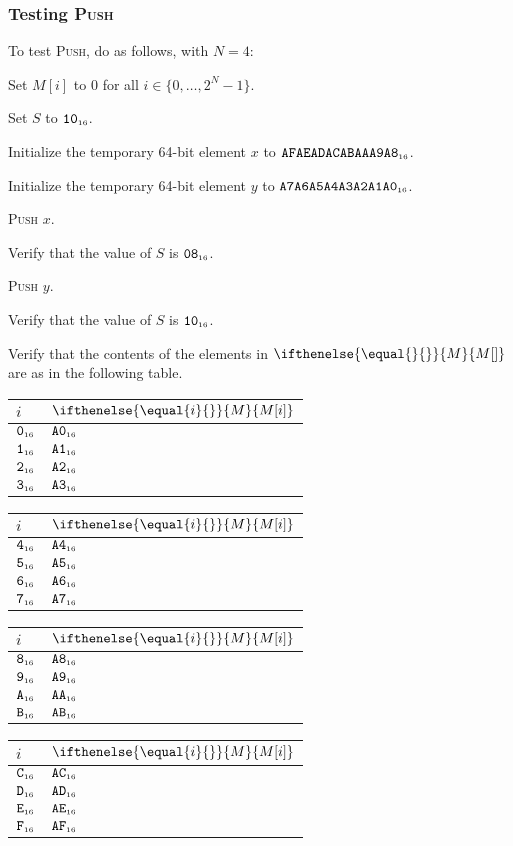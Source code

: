 \documentclass[a4paper,12pt]{article}
\makeatletter
\newcommand{\num}[1]{\texttt{#1}}
\newcommand{\hex}[1]{\num{#1}_{\textup{\tiny 16}}}
\newcommand{\MEM}[1]{\ifthenelse{\equal{#1}{}}{M}{M[#1]}}
\newcommand{\SP}{S}
\newcommand{\range}[2]{\{#1,\ldots,#2\}}
\newcommand{\proc}[1]{\textsc{#1}}
\newenvironment{memtable}{%
  \begin{trivlist}
    \item
    }{%
    \end{trivlist}}
\newenvironment{memcolumn}{%
  \begin{tabular}{@{}ll@{}}
    $i$ & $\MEM{i}$ \\
    \hline}
    {%
    \hline
  \end{tabular}}
\newcommand{\memspace}{\qquad}
\makeatother
\begin{document}
\subsubsection{Testing \proc{Push}}

To test \proc{Push}, do as follows, with $N=4$:
\begin{stepnumbers}
\item Set $M[i]$ to 0 for all $i \in \range{0}{2^N-1}$.
\item Set $\SP$ to $\hex{10}$.
\item Initialize the temporary 64-bit element $x$ to $\hex{AFAEADACABAAA9A8}$.
\item Initialize the temporary 64-bit element $y$ to $\hex{A7A6A5A4A3A2A1A0}$.
\item \proc{Push} $x$.
\item Verify that the value of $\SP$ is $\hex{08}$.
\item \proc{Push} $y$.
\item Verify that the value of $\SP$ is $\hex{10}$.
\item Verify that the contents of the elements in $\MEM{}$ are as in the following table.
\end{stepnumbers}

\begin{memtable}
  \begin{memcolumn}
    $\hex{0}$ & $\hex{A0}$ \\
    $\hex{1}$ & $\hex{A1}$ \\
    $\hex{2}$ & $\hex{A2}$ \\
    $\hex{3}$ & $\hex{A3}$ \\
  \end{memcolumn}
  \memspace
  \begin{memcolumn}
    $\hex{4}$ & $\hex{A4}$ \\
    $\hex{5}$ & $\hex{A5}$ \\
    $\hex{6}$ & $\hex{A6}$ \\
    $\hex{7}$ & $\hex{A7}$ \\
  \end{memcolumn}
  \memspace
  \begin{memcolumn}
    $\hex{8}$ & $\hex{A8}$ \\
    $\hex{9}$ & $\hex{A9}$ \\
    $\hex{A}$ & $\hex{AA}$ \\
    $\hex{B}$ & $\hex{AB}$ \\
  \end{memcolumn}
  \memspace
  \begin{memcolumn}
    $\hex{C}$ & $\hex{AC}$ \\
    $\hex{D}$ & $\hex{AD}$ \\
    $\hex{E}$ & $\hex{AE}$ \\
    $\hex{F}$ & $\hex{AF}$ \\
  \end{memcolumn}
\end{memtable}
\end{document}
